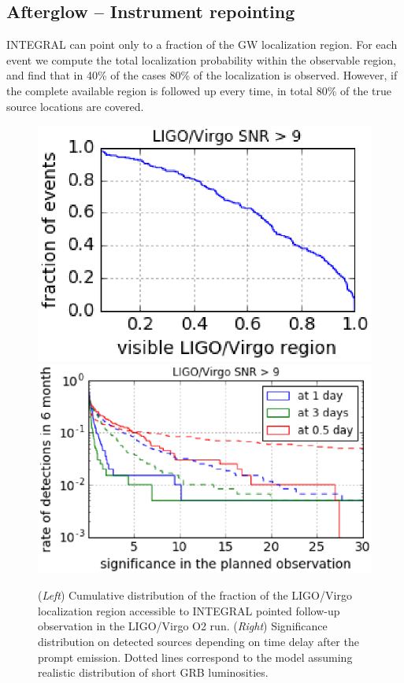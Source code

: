 \documentclass[11pt]{article}
\begin{document}
\subsection*{Afterglow -- Instrument repointing}

INTEGRAL can point only to a fraction of the GW localization region. For each
event we compute the total localization probability within the observable
region, and find that in 40\% of the cases 80\% of the localization is
observed. However, if the complete available region is followed up every
time, in total 80\% of the true source locations are covered.

\begin{figure}
	\centering
  	\includegraphics[scale=.5]{CR_f4.eps}
  	\includegraphics[scale=.4]{SR_f4.eps}

  	\caption{(\textit{Left}) Cumulative distribution of the
    fraction of the LIGO/Virgo localization region accessible to
    INTEGRAL pointed follow-up observation in the LIGO/Virgo O2
    run. (\textit{Right}) Significance distribution on detected
    sources depending on time delay after the prompt emission. Dotted
    lines correspond to the model assuming realistic distribution of short GRB luminosities.}
    \label{covered_region}
\end{figure}
\end{document}
